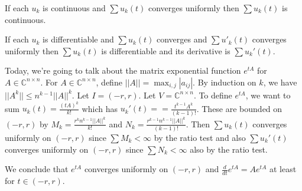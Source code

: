 \documentclass{article}
\newcommand{\C}{\mathbb{C}}
\begin{document}
If each $u_k$ is continuous and $\sum u_k(t)$ converges uniformly then $\sum u_k(t)$ is continuous. 

If each $u_k$ is differentiable and $\sum u_k(t)$ converges and $\sum u'_k(t)$ converges uniformly then $\sum u_k(t)$ is differentiable and its derivative is $\sum u_k'(t)$.

Today, we're going to talk about the matrix exponential function $e^{tA}$ for $A\in \C^{n\times n}$. For $A\in \C^{n\times n}$, define $||A||=\max_{i,j}|a_{ij}|$. By induction on $k$, we have $||A^k||\leq n^{k-1}||A||^k$. Let $I=(-r,r)$. Let $V=\C^{n\times n}$. To define $e^{tA}$, we want to sum $u_k(t)=\frac{(tA)^k}{k!}$ which has $u_k'(t)==\frac{t^{k-1}A^k}{(k-1)!}$. These are bounded on $(-r,r)$ by $M_k=\frac{r^kn^{k-1}||A||^k}{k!}$ and $N_k=\frac{r^{k-1}n^{k-1}||A||^k}{(k-1)!}$. Then $\sum u_k(t)$ converges uniformly on $(-r,r)$ since $\sum M_k<\infty$ by the ratio test and also $\sum u_k'(t)$ converges uniformly on $(-r,r)$ since $\sum N_k<\infty$ also by the ratio test.

We conclude that $e^{tA}$ converges uniformly on $(-r,r)$ and $\frac{d}{dt}e^{tA}=Ae^{tA}$ at least for $t\in (-r,r)$.
\end{document}
